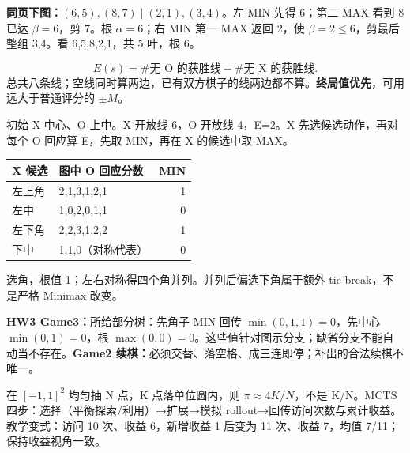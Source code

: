 \textbf{同页下图：}$(6,5),(8,7)\mid(2,1),(3,4)$。左 MIN 先得 6；第二 MAX 看到 8 已达 $\beta=6$，剪 7。根 $\alpha=6$；右 MIN 第一 MAX 返回 2，使 $\beta=2\le6$，剪最后整组 3,4。看 6,5,8,2,1，共 5 叶，根 6。

\[
E(s)=\#\text{无 O 的获胜线}-\#\text{无 X 的获胜线}.
\]
总共八条线；空线同时算两边，已有双方棋子的线两边都不算。\textbf{终局值优先}，可用远大于普通评分的 $\pm M$。

初始 X 中心、O 上中。X 开放线 6，O 开放线 4，E=2。X 先选候选动作，再对每个 O 回应算 E，先取 MIN，再在 X 的候选中取 MAX。
\begin{center}\begin{tabular}{l|l|r}\toprule
X 候选&图中 O 回应分数&MIN\\\midrule
左上角&2,1,3,1,2,1&1\\左中&1,0,2,0,1,1&0\\
左下角&2,2,3,1,2,2&1\\下中&1,1,0（对称代表）&0\\\bottomrule
\end{tabular}\end{center}
选角，根值 1；左右对称得四个角并列。并列后偏选下角属于额外 tie-break，不是严格 Minimax 改变。

\textbf{HW3 Game3：}所给部分树：先角子 MIN 回传 $\min(0,1,1)=0$，先中心 $\min(0,1)=0$，根 $\max(0,0)=0$。这些值针对图示分支；缺省分支不能自动当不存在。\textbf{Game2 续棋：}必须交替、落空格、成三连即停；补出的合法续棋不唯一。

在 $[-1,1]^2$ 均匀抽 N 点，K 点落单位圆内，则 $\pi\approx4K/N$，不是 K/N。MCTS 四步：选择（平衡探索/利用）→扩展→模拟 rollout→回传访问次数与累计收益。教学变式：访问 10 次、收益 6，新增收益 1 后变为 11 次、收益 7，均值 7/11；保持收益视角一致。
